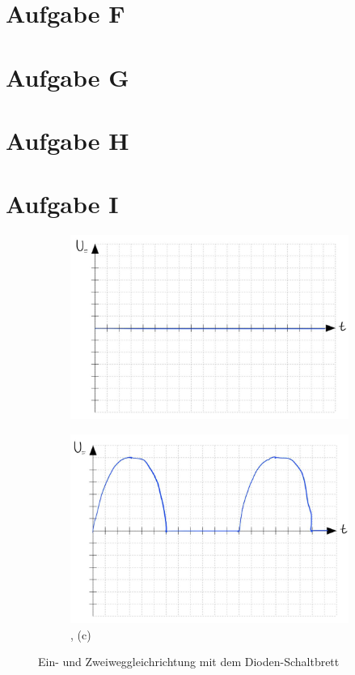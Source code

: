 \section*{Aufgabe F}
\section*{Aufgabe G}
\section*{Aufgabe H}
\section*{Aufgabe I}
\begin{figure}[H]
    \begin{subfigure}[b]{0.45\textwidth}
        \includegraphics[width=\textwidth]{figs/Voraufgaben/Ia.jpg}
        \caption{}
        \label{fig:VA_I_a}
    \end{subfigure}
    \hfill
    \begin{subfigure}[b]{0.45\textwidth}
        \includegraphics[width=\textwidth]{figs/Voraufgaben/Ib,c.jpg}
        \caption{, (c)}
        \label{fig:VA_I_d}
    \end{subfigure}
    \caption{Ein- und Zweiweggleichrichtung mit dem Dioden-Schaltbrett}
\end{figure}

